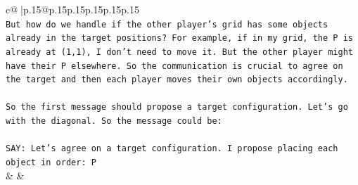 \documentclass{article}
\begin{document}
{\begin{supertabular}{c@{$\;$}|p{.15\linewidth}@{}p{.15\linewidth}p{.15\linewidth}p{.15\linewidth}p{.15\linewidth}p{.15\linewidth}}
{{{\\ 
\texttt{But how do we handle if the other player's grid has some objects already in the target positions? For example, if in my grid, the P is already at (1,1), I don't need to move it. But the other player might have their P elsewhere. So the communication is crucial to agree on the target and then each player moves their own objects accordingly.} \\
\\ 
\texttt{So the first message should propose a target configuration. Let's go with the diagonal. So the message could be:} \\
\\ 
\texttt{SAY: Let's agree on a target configuration. I propose placing each object in order: P} \\
            }
        }
    }
    & & \\ \\


\end{supertabular}}
\end{document}
